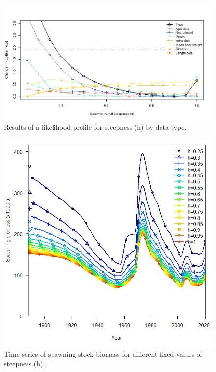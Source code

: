 \documentclass[11pt,
  english,
  a4paper,
]{article}
\begin{document}
\tagmcend\tagstructend


\begin{figure}
\centering
\includegraphics[width=1\textwidth,height=1\textheight]{figs/Hprofile_plot_likelihood.png}
\caption{Results of a likelihood profile for steepness (h) by data type. \label{fig:profile_like_h}}
\end{figure}

\tagmcend\tagstructend


\begin{figure}
\centering
\includegraphics[width=1\textwidth,height=1\textheight]{figs/hprofile_plot_ssb.png}
\caption{Time-series of spawning stock biomass for different fixed values of steepness (h).\label{fig:profile_ssb_h}}
\end{figure}
\end{document}
